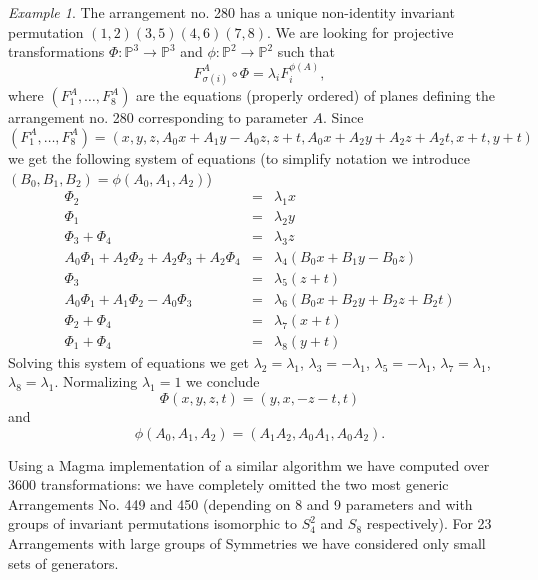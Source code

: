 \documentclass[12pt]{amsart}
\theoremstyle{plain}
\theoremstyle{remark}
\newtheorem{exmp}{Example}
\theoremstyle{definition}
\newcommand{\PP}{\mathbb P}
\newcommand{\lra}{\longrightarrow}
\numberwithin{table}{section}
\begin{document}
\begin{exmp}\label{ex280}
	The	arrangement no. 280 has a unique non-identity invariant permutation $(1,2)(3,5)(4,6)(7,8)$. We are looking for projective transformations $\Phi:\PP^{3}\lra \PP^{3}$ and $\phi:\PP^{2}\lra\PP^{2}$ such that
	\[F_{\sigma(i)}^{A}\circ \Phi=\lambda_{i}F_{i}^{\phi(A)},\]
	where $(F_{1}^{A},\dots,F_{8}^{A})$ are the equations (properly ordered) of planes defining the arrangement no. 280 corresponding to parameter $A$.
	Since
	\[(F_{1}^{A},\dots,F_{8}^{A})=\left(x, y, z, A_{0}x + A_{1}y - A_{0}z, z + t, A_{0}x + A_{2}y + A_{2}z + A_{2}t, x + t, y + t\right)\]
	we get the following system of equations (to simplify notation we introduce $(B_{0},B_{1},B_{2}) = \phi(A_{0},A_{1},A_{2})$)
	\begin{eqnarray*}
		\Phi_{2}&=&\lambda_{1}x\\
		\Phi_{1}&=&\lambda_{2}y\\
		\Phi_{3}+\Phi_{4}&=&\lambda_{3}z\\
		A_{0}\Phi_{1}+A_{2}\Phi_{2}+A_{2}\Phi_{3}+A_{2}\Phi_{4} &=& \lambda_{4}(B_{0}x+B_{1}y-B_{0}z)\\
		\Phi_{3}&=&\lambda_{5}(z+t)\\
		A_{0}\Phi_{1}+A_{1}\Phi_{2}-A_{0}\Phi_{3} &=& \lambda_{6}(B_{0}x+B_{2}y+B_{2}z+B_{2}t)\\
		\Phi_{2}+\Phi_{4}&=&\lambda_{7}(x+t)\\
		\Phi_{1}+\Phi_{4}&=&\lambda_{8}(y+t)
	\end{eqnarray*}
Solving this system of equations we get
$\lambda_{2}=\lambda_{1}$, $\lambda_{3}=-\lambda_{1}$, $\lambda_{5}=-\lambda_{1}$,  $\lambda_{7}=\lambda_{1}$, $\lambda_{8}=\lambda_{1}$. Normalizing $\lambda_{1}=1$ we conclude
\[\Phi(x,y,z,t)=(y,x,-z-t,t)\]
and \[\phi(A_{0},A_{1},A_{2})=(A_{1}A_{2},A_{0}A_{1},A_{0}A_{2}).\]
\end{exmp}
Using a Magma implementation of a similar algorithm we have computed over 3600 transformations: we have completely omitted the two most generic Arrangements No. 449 and 450 (depending on 8 and 9 parameters and with groups of invariant permutations isomorphic to $S_{4}^{2}$ and $S_{8}$ respectively). For 23 Arrangements with large groups of Symmetries we have considered only small sets of generators.
\end{document}
